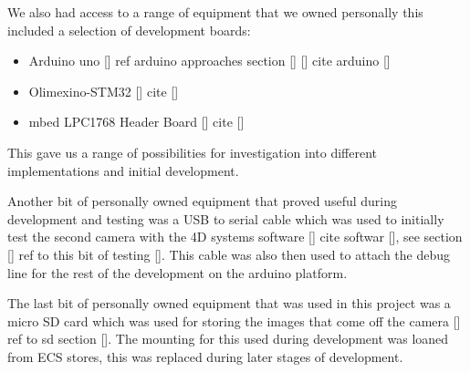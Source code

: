 We also had access to a range of equipment that we owned personally this included a selection of development boards:

\begin{itemize}
	\item Arduino uno [] ref arduino approaches section [] [] cite arduino []
	\item Olimexino-STM32 [] cite []
	\item mbed LPC1768 Header Board [] cite []
\end{itemize}

This gave us a range of possibilities for investigation into different implementations and initial development.

Another bit of personally owned equipment that proved useful during development and testing was a USB to serial cable which was used to initially test the second camera with the 4D systems software [] cite softwar [], see section [] ref to this bit of testing []. This cable was also then used to attach the debug line for the rest of the development on the arduino platform.

The last bit of personally owned equipment that was used in this project was a micro SD card which was used for storing the images that come off the camera [] ref to sd section []. The mounting for this used during development was loaned from ECS stores, this was replaced during later stages of development.